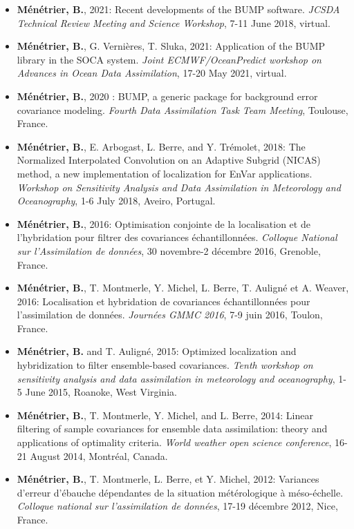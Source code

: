\documentclass[a4paper,9pt]{scrreprt}
\begin{document}
\begin{itemize}
\item \textbf{Ménétrier, B.}, 2021: Recent developments of the BUMP software. \textit{JCSDA Technical Review Meeting and Science Workshop}, 7-11 June 2018, virtual.\vspace{-0.1cm}
\item \textbf{Ménétrier, B.}, G. Vernières, T. Sluka, 2021: Application of the BUMP library
in the SOCA system. \textit{Joint ECMWF/OceanPredict workshop on Advances in Ocean Data
Assimilation}, 17-20 May 2021, virtual.\vspace{-0.1cm}
\item \textbf{Ménétrier, B.}, 2020 : BUMP, a generic package for background error covariance modeling. \textit{Fourth Data Assimilation Task Team Meeting}, Toulouse, France.\vspace{-0.1cm}
\item \textbf{Ménétrier, B.}, E. Arbogast, L. Berre, and Y. Trémolet, 2018: The Normalized Interpolated Convolution on an Adaptive Subgrid (NICAS) method, a new implementation of localization for EnVar applications. \textit{Workshop on Sensitivity Analysis and Data Assimilation in Meteorology and Oceanography}, 1-6 July 2018, Aveiro, Portugal.\vspace{-0.1cm}
\item \textbf{Ménétrier, B.}, 2016: Optimisation conjointe de la localisation et de l’hybridation pour filtrer des covariances échantillonnées. \textit{Colloque National sur l'Assimilation de données}, 30 novembre-2 décembre 2016, Grenoble, France.\vspace{-0.1cm}
\item \textbf{Ménétrier, B.}, T. Montmerle, Y. Michel, L. Berre, T. Auligné et A. Weaver, 2016: Localisation et hybridation de covariances échantillonnées pour l'assimilation de données. \textit{Journées GMMC 2016}, 7-9 juin 2016, Toulon, France.\vspace{-0.1cm}
\item \textbf{Ménétrier, B.} and T. Auligné, 2015: Optimized localization and hybridization to filter ensemble-based covariances. \textit{Tenth workshop on sensitivity analysis and data assimilation in meteorology and oceanography}, 1-5 June 2015, Roanoke, West Virginia.\vspace{-0.1cm}
\item \textbf{Ménétrier, B.}, T. Montmerle, Y. Michel, and L. Berre, 2014: Linear filtering of sample covariances for ensemble data assimilation: theory and applications of optimality criteria. \textit{World weather open science conference}, 16-21 August 2014, Montréal, Canada.\vspace{-0.1cm}
\item \textbf{Ménétrier, B.}, T. Montmerle, L. Berre, et Y. Michel, 2012: Variances d'erreur d'ébauche dépendantes de la situation métérologique à méso-échelle. \textit{Colloque national sur l'assimilation de données}, 17-19 décembre 2012, Nice, France.
\end{itemize}
\end{document}
